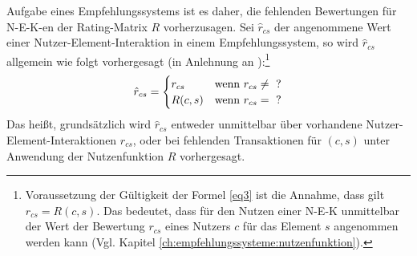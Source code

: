 Aufgabe eines Empfehlungssystems ist es daher, die fehlenden Bewertungen für \ac{N-E-K}-en der Rating-Matrix $R$ vorherzusagen.
Sei $\hat{r}_{cs}$ der angenommene Wert einer Nutzer-Element-Interaktion in einem Empfehlungssystem, so wird $\hat{r}_{cs}$ allgemein wie folgt vorhergesagt (in Anlehnung an \cite[S. 743]{adomavicius:inproceedings}):\footnote{Voraussetzung der Gültigkeit der Formel \ref{eq3} ist die Annahme, dass gilt $r_{cs} = R(c,s)$. Das bedeutet, dass für den Nutzen einer \ac{N-E-K} unmittelbar der Wert der Bewertung $r_{cs}$ eines Nutzers $c$ für das Element $s$ angenommen werden kann (Vgl. Kapitel \ref{ch:empfehlungssysteme:nutzenfunktion}).}
\begin{equation}\label{eq3}
\hat{r}_{cs} =
    \begin{cases}
        r_{cs} & \textnormal{wenn } r_{cs} \neq \textnormal{ ?} \\
        R(c,s) & \textnormal{wenn }r_{cs} = \textnormal{ ?} \\
    \end{cases}
\end{equation}
Das heißt, grundsätzlich wird $\hat{r}_{cs}$ entweder unmittelbar über vorhandene Nutzer-Element-Interaktionen $r_{cs}$, oder bei fehlenden Transaktionen für $(c,s)$ unter Anwendung der Nutzenfunktion $R$ vorhergesagt.

